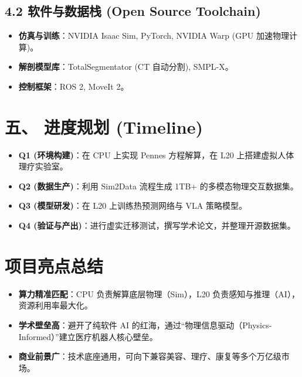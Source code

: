 \documentclass[a4paper,12pt]{article}
\begin{document}
\subsection{4.2 软件与数据栈 (Open Source Toolchain)}
\begin{itemize}
    \item \textbf{仿真与训练}：NVIDIA Isaac Sim, PyTorch, NVIDIA Warp (GPU 加速物理计算)。
    \item \textbf{解剖模型库}：TotalSegmentator (CT 自动分割), SMPL-X。
    \item \textbf{控制框架}：ROS 2, MoveIt 2。
\end{itemize}

\section{五、 进度规划 (Timeline)}
\begin{itemize}
    \item \textbf{Q1 (环境构建)}：在 CPU 上实现 Pennes 方程解算，在 L20 上搭建虚拟人体理疗实验室。
    \item \textbf{Q2 (数据生产)}：利用 Sim2Data 流程生成 1TB+ 的多模态物理交互数据集。
    \item \textbf{Q3 (模型研发)}：在 L20 上训练热预测网络与 VLA 策略模型。
    \item \textbf{Q4 (验证与产出)}：进行虚实迁移测试，撰写学术论文，并整理开源数据集。
\end{itemize}

\section{项目亮点总结}
\begin{itemize}
    \item \textbf{算力精准匹配}：CPU 负责解算底层物理（Sim），L20 负责感知与推理（AI），资源利用率最大化。
    \item \textbf{学术壁垒高}：避开了纯软件 AI 的红海，通过“物理信息驱动（Physics-Informed）”建立医疗机器人核心壁垒。
    \item \textbf{商业前景广}：技术底座通用，可向下兼容美容、理疗、康复等多个万亿级市场。
\end{itemize}



\end{document}
